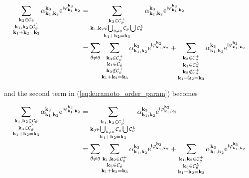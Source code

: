 \documentclass[9pt]{article}
\newcommand{\triad}[3]{\varphi_{#1, #2}^{#3}}                     %
\newcommand{\ii}{\mathrm{i}}      								  %
\newcommand{\e}{\mathrm{e}}      								  %
\newcommand{\alphakkk}[3]{\alpha_{\bfkn{#1}, \bfkn{#2}}^{\bfkn{#3}}}
\newcommand{\bfkn}[1]{\mathbf{k}_{#1}}								%
\begin{document}
\begin{align}
	\sum_{\substack{\bfkn{3} \in \mathcal{C}_{\theta} \\ \bfkn{1},  \bfkn{2} \in \mathcal{C}_{\theta}^{'} \\ \bfkn{1} + \bfkn{2} = \bfkn{3}}} \alphakkk{{1}}{2}{3}\e^{\ii \triad{\bfkn{1}}{\bfkn{2}}{\bfkn{3}}} &= \sum_{\substack{\bfkn{3} \in \mathcal{C}_{\theta}^{+} \\ \bfkn{1},  \bfkn{2} \in \bigcup_{\tilde{\theta} \neq \theta} \mathcal{C}_{\tilde{\theta}} \bigcup \mathcal{C}_{\theta}^{L} \\ \bfkn{1} + \bfkn{2} = \bfkn{3}}} \alphakkk{{1}}{2}{3}\e^{\ii \triad{\bfkn{1}}{\bfkn{2}}{\bfkn{3}}} \notag \\
	&= \sum_{\tilde{\theta} \neq \theta} \sum_{\substack{\bfkn{3} \in \mathcal{C}_{\theta}^{+} \\ \bfkn{1} \in \mathcal{C}_{\tilde{\theta}} \\ \bfkn{2} \notin \mathcal{C}_{\theta}^{+} \\ \bfkn{1} + \bfkn{2} = \bfkn{3}}} \alphakkk{{1}}{2}{3}\e^{\ii \triad{\bfkn{1}}{\bfkn{2}}{\bfkn{3}}} + \sum_{\substack{\bfkn{3} \in \mathcal{C}_{\theta}^{+} \\ \bfkn{1} \in \mathcal{C}_{\theta}^{L} \\ \bfkn{2} \notin \mathcal{C}_{\theta}^{+} \\ \bfkn{1} + \bfkn{2} = \bfkn{3}}} \alphakkk{{1}}{2}{3}\e^{\ii \triad{\bfkn{1}}{\bfkn{2}}{\bfkn{3}}}
\end{align}

and the second term in (\ref{eq:kuramoto_order_param}) becomes

\begin{align}
	\sum_{\substack{\bfkn{1}, \bfkn{2} \in \mathcal{C}_{\theta} \\ \bfkn{3} \in \mathcal{C}_{\theta}^{'} \\ \bfkn{1} + \bfkn{2} = \bfkn{3}}} \alphakkk{{1}}{2}{3}\e^{\ii \triad{\bfkn{1}}{\bfkn{2}}{\bfkn{3}}} &= \sum_{\substack{\bfkn{1}, \bfkn{2} \in \mathcal{C}_{\theta}^{+} \\ \bfkn{3} \in \bigcup_{\tilde{\theta} \neq \theta} \mathcal{C}_{\tilde{\theta}} \bigcup \mathcal{C}_{\theta}^{L} \\ \bfkn{1} + \bfkn{2} = \bfkn{3}}} \alphakkk{{1}}{2}{3}\e^{\ii \triad{\bfkn{1}}{\bfkn{2}}{\bfkn{3}}} \notag \\
	&= \sum_{\tilde{\theta} \neq \theta} \sum_{\substack{\bfkn{1}, \bfkn{2} \in \mathcal{C}_{\theta}^{+} \\ \bfkn{3} \in \mathcal{C}_{\tilde{\theta}} \\ \bfkn{1} + \bfkn{2} = \bfkn{3}}} \alphakkk{{1}}{2}{3}\e^{\ii \triad{\bfkn{1}}{\bfkn{2}}{\bfkn{3}}} + \sum_{\substack{\bfkn{1}, \bfkn{2} \in \mathcal{C}_{\theta}^{+} \\ \bfkn{3} \in \mathcal{C}_{\theta}^{L} \\ \bfkn{1} + \bfkn{2} = \bfkn{3}}} \alphakkk{{1}}{2}{3}\e^{\ii \triad{\bfkn{1}}{\bfkn{2}}{\bfkn{3}}}
\end{align}
\end{document}
